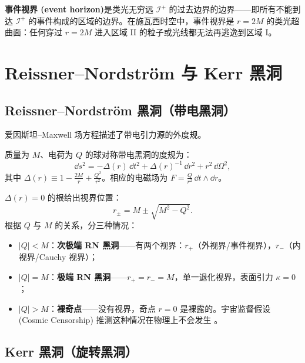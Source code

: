 \begin{definition}[事件视界]
\textbf{事件视界 (event horizon)}是类光无穷远 $\mathscr{I}^+$ 的过去边界的边界——即所有不能到达 $\mathscr{I}^+$ 的事件构成的区域的边界。在施瓦西时空中，事件视界是 $r=2M$ 的类光超曲面：任何穿过 $r=2M$ 进入区域 II 的粒子或光线都无法再逃逸到区域 I。
\end{definition}

\section{Reissner–Nordström 与 Kerr 黑洞}
\label{sec:RN_Kerr}

\subsection{Reissner–Nordström 黑洞（带电黑洞）}

爱因斯坦–Maxwell 场方程描述了带电引力源的外度规。

\begin{definition}
质量为 $M$、电荷为 $Q$ 的球对称带电黑洞的度规为：
\begin{equation}
    \boxed{\dd s^2 = -\Delta(r)\,\dd t^2 + \Delta(r)^{-1}\,\dd r^2 + r^2\,\dd\Omega^2},
    \label{eq:RN_metric}
\end{equation}
其中 $\Delta(r) \equiv 1 - \frac{2M}{r} + \frac{Q^2}{r^2}$。相应的电磁场为 $F = \frac{Q}{r^2}\,\dd t \wedge \dd r$。
\end{definition}

\begin{theorem}[RN 黑洞的视界结构]
$\Delta(r)=0$ 的根给出视界位置：
\begin{equation}
    r_\pm = M \pm \sqrt{M^2 - Q^2}.
\end{equation}
根据 $Q$ 与 $M$ 的关系，分三种情况：
\begin{itemize}
    \item $|Q| < M$：\textbf{次极端 RN 黑洞}——有两个视界：$r_+$（外视界/事件视界），$r_-$（内视界/Cauchy 视界）；
    \item $|Q| = M$：\textbf{极端 RN 黑洞}——$r_+ = r_- = M$，单一退化视界，表面引力 $\kappa = 0$；
    \item $|Q| > M$：\textbf{裸奇点}——没有视界，奇点 $r=0$ 是裸露的。宇宙监督假设 (Cosmic Censorship) 推测这种情况在物理上不会发生 \cite{Penrose1965}。
\end{itemize}
\end{theorem}

\subsection{Kerr 黑洞（旋转黑洞）}

